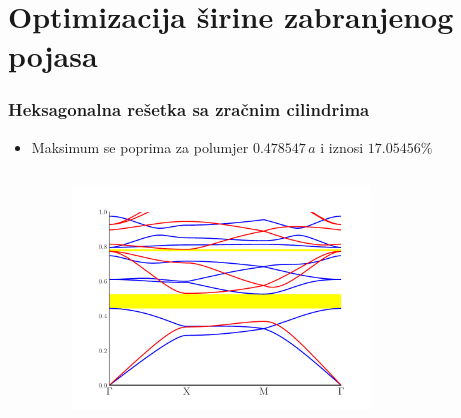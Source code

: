 \documentclass{beamer}
\begin{document}
\section{Optimizacija širine zabranjenog pojasa}
\begin{frame}
	\frametitle{Heksagonalna rešetka sa zračnim cilindrima}
	\begin{itemize}
		\item Maksimum se poprima za polumjer $0.478547 \, a$ i iznosi
			$17.05456 \%$
	\begin{columns}
		\begin{figure}[ht]
			\centering
			\includegraphics[width=\linewidth]
    			{./images/pdf/triangular_lattice_holes_band_diag_max.pdf}
		\end{figure}
		\begin{figure}[ht]
			\centering

\end{figure}
\end{columns}
\end{itemize}
\end{frame}
\end{document}
